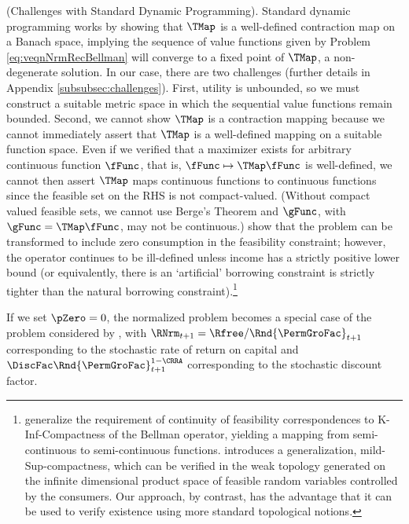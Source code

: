 \documentclass[BufferStockTheory]{subfiles}
\begin{document}
\begin{remark} (Challenges with Standard Dynamic Programming).
Standard dynamic programming works by showing that $\TMap$ is a well-defined contraction map on a Banach space, implying the sequence of value functions given by Problem \ref{eq:veqnNrmRecBellman} will converge to a fixed point of $\TMap$, a non-degenerate solution.  In our case, there are two challenges (further details in Appendix \ref{subsubsec:challenges}). First, utility is unbounded, so we must construct a suitable metric space in which the sequential value functions remain bounded. Second, we cannot show  $\TMap$ is a contraction mapping because we cannot immediately assert that $\TMap$ is a well-defined mapping on a suitable function space. Even if we verified that a maximizer exists for arbitrary continuous function $\fFunc$, that is, $\fFunc\mapsto\TMap \fFunc$ is well-defined, we cannot then assert $\TMap$ maps continuous functions to continuous functions since the feasible set on the RHS is not compact-valued. (Without compact valued feasible sets, we cannot use  Berge's Theorem and $\gFunc$, with $\gFunc = \TMap\fFunc$, may not be continuous.) \cite{maUnboundedDP} show that the problem can be transformed to include zero consumption in the feasibility constraint; however, the operator continues to be ill-defined unless income has a strictly positive lower bound (or equivalently, there is an `artificial' borrowing constraint is strictly tighter than the natural borrowing constraint).\footnote{\cite{Feinberg2012} generalize the requirement of continuity of feasibility correspondences to K-Inf-Compactness of the Bellman operator, yielding a mapping from semi-continuous to semi-continuous functions. \cite{Shanker2017a} introduces a generalization, mild-Sup-compactness, which can be verified in the weak topology generated on the infinite dimensional product space of feasible random variables controlled by the consumers. Our approach, by contrast, has the advantage that it can be used to verify existence using more standard topological notions.} 
\end{remark}

\begin{remark}\label{remark:stochdiscMST}
If we set $\pZero=0$, the normalized problem becomes a special case of the problem considered by \cite{mstIncFluct}, with $\RNrm_{t+1}=\Rfree/\Rnd{\PermGroFac}_{t+1}$ corresponding to the stochastic rate of return on capital and $\DiscFac \Rnd{\PermGroFac}_{t+1}^{1-\CRRA}$  corresponding to the stochastic discount factor.
\end{remark}
\end{document}
